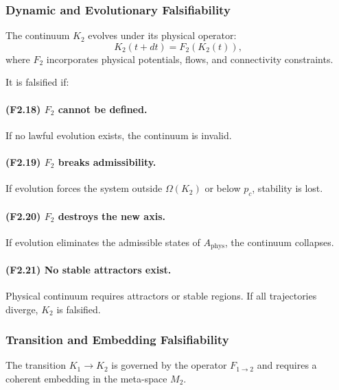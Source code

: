 \subsubsection{Dynamic and Evolutionary Falsifiability}

The continuum $K_2$ evolves under its physical operator:
\[
K_2(t+dt) = F_2(K_2(t)),
\]
where $F_2$ incorporates physical potentials, flows, and connectivity
constraints.

It is falsified if:

\paragraph{(F2.18) \texorpdfstring{$F_2$}{F_2} cannot be defined.}
If no lawful evolution exists, the continuum is invalid.

\paragraph{(F2.19) \texorpdfstring{$F_2$}{F_2} breaks admissibility.}
If evolution forces the system outside $\Omega(K_2)$ or below $p_c$,
stability is lost.

\paragraph{(F2.20) \texorpdfstring{$F_2$}{F_2} destroys the new axis.}
If evolution eliminates the admissible states of $A_{\mathrm{phys}}$, the
continuum collapses.

\paragraph{(F2.21) No stable attractors exist.}
Physical continuum requires attractors or stable regions.
If all trajectories diverge, $K_2$ is falsified.



\subsubsection{Transition and Embedding Falsifiability}

The transition $K_1 \to K_2$ is governed by the operator $F_{1\to 2}$ and
requires a coherent embedding in the meta-space $M_2$.

